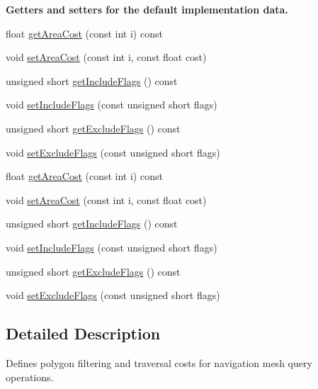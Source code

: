 \begin{Indent}\textbf{ Getters and setters for the default implementation data.}\par
\begin{DoxyCompactItemize}
\item 
float \hyperlink{classdtQueryFilter_a1e41582a45d2a10eb7e68740475e5665}{get\+Area\+Cost} (const int i) const
\item 
void \hyperlink{classdtQueryFilter_a36063c39d5c391a393412108a8a33927}{set\+Area\+Cost} (const int i, const float cost)
\item 
unsigned short \hyperlink{classdtQueryFilter_a5bae688840167576dc6ab7913dda1b34}{get\+Include\+Flags} () const
\item 
void \hyperlink{classdtQueryFilter_ab9783c92a30e41df84ebfd2f68338970}{set\+Include\+Flags} (const unsigned short flags)
\item 
unsigned short \hyperlink{classdtQueryFilter_ac3e2d16755c3510003f0580e27ce4897}{get\+Exclude\+Flags} () const
\item 
void \hyperlink{classdtQueryFilter_a18c1b888c9b2c3b30703d6861a793600}{set\+Exclude\+Flags} (const unsigned short flags)
\item 
float \hyperlink{classdtQueryFilter_a1e41582a45d2a10eb7e68740475e5665}{get\+Area\+Cost} (const int i) const
\item 
void \hyperlink{classdtQueryFilter_a36063c39d5c391a393412108a8a33927}{set\+Area\+Cost} (const int i, const float cost)
\item 
unsigned short \hyperlink{classdtQueryFilter_a5bae688840167576dc6ab7913dda1b34}{get\+Include\+Flags} () const
\item 
void \hyperlink{classdtQueryFilter_ab9783c92a30e41df84ebfd2f68338970}{set\+Include\+Flags} (const unsigned short flags)
\item 
unsigned short \hyperlink{classdtQueryFilter_ac3e2d16755c3510003f0580e27ce4897}{get\+Exclude\+Flags} () const
\item 
void \hyperlink{classdtQueryFilter_a18c1b888c9b2c3b30703d6861a793600}{set\+Exclude\+Flags} (const unsigned short flags)
\end{DoxyCompactItemize}
\end{Indent}


\subsection{Detailed Description}
Defines polygon filtering and traversal costs for navigation mesh query operations.

